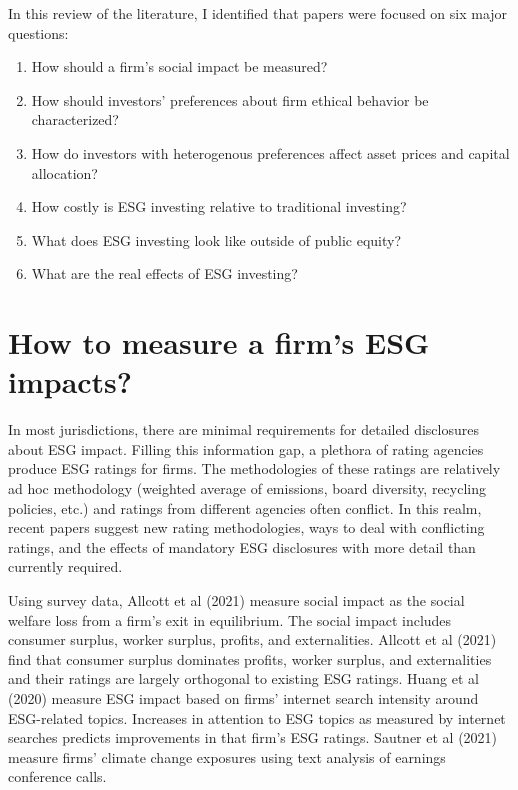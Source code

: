 \documentclass{article}
\begin{document}
\bigskip

In this review of the literature, I identified that papers were focused on six major questions:

\begin{enumerate}
\item How should a firm's social impact be measured?

\item How should investors' preferences about firm ethical behavior be characterized?

\item How do investors with heterogenous preferences affect asset prices and capital allocation?

\item How costly is ESG investing relative to traditional investing?

\item What does ESG investing look like outside of public equity?

\item What are the real effects of ESG investing?
\end{enumerate}

\section{How to measure a firm's ESG impacts?}

In most jurisdictions, there are minimal requirements for detailed disclosures about ESG impact. Filling this information gap, a plethora of rating agencies produce ESG ratings for firms.  The methodologies of these ratings are relatively ad hoc methodology (weighted average of emissions, board diversity, recycling policies, etc.) and ratings from different agencies often conflict. In this realm, recent papers suggest new rating methodologies, ways to deal with conflicting ratings, and the effects of mandatory ESG disclosures with more detail than currently required.

\bigskip

Using survey data, Allcott et al (2021) measure social impact as the social welfare loss from a firm's exit in equilibrium. The social impact includes consumer surplus, worker surplus, profits, and externalities.  Allcott et al (2021) find that consumer surplus dominates profits, worker surplus, and externalities and their ratings are largely orthogonal to existing ESG ratings. Huang et al (2020) measure ESG impact based on firms' internet search intensity around ESG-related topics. Increases in attention to ESG topics as measured by internet searches predicts
improvements in that firm's ESG ratings. Sautner et al (2021) measure firms' climate change exposures using text analysis of earnings conference calls. 
\end{document}
